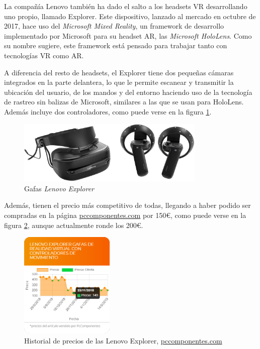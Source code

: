 La compañía Lenovo también ha dado el salto a los headsets \acs{VR} desarrollando uno propio, llamado Explorer. Este dispositivo, lanzado al mercado en octubre de 2017, hace uso del \textit{Microsoft Mixed Reality}, un framework de desarrollo implementado por Microsoft para su headset \acs{AR}, las \textit{Microsoft HoloLens}. Como su nombre sugiere, este framework está pensado para trabajar tanto con tecnologías \acs{VR} como \acs{AR}.
    
A diferencia del resto de headsets, el Explorer tiene dos pequeñas cámaras integrados en la parte delantera, lo que le permite escanear y transmitir la ubicación del usuario, de los mandos y del entorno haciendo uso de la tecnología de rastreo sin balizas de Microsoft, similares a las que se usan para HoloLens. Además incluye dos controladores, como puede verse en la figura \ref{fig:lenovo-explorer}.

\begin{figure}[!h]
\begin{center}
\includegraphics[width=0.8\textwidth]{imagenes/2/lenovo-explorer.jpg}
\caption{Gafas \textit{Lenovo Explorer}}
\label{fig:lenovo-explorer}
\end{center}
\end{figure}

Además, tienen el precio más competitivo de todas, llegando a haber podido ser compradas en la página \url{pccomponentes.com} por 150\euro, como puede verse en la figura \ref{fig:precios-explorer}, aunque actualmente ronde los 200\euro. 

\begin{figure}[!h]
\begin{center}
    \includegraphics[width=0.4\textwidth]{imagenes/2/precios-explorer.png}
    \caption{Historial de precios de las Lenovo Explorer, \url{pccomponentes.com}}
    \label{fig:precios-explorer}
\end{center}
\end{figure}

